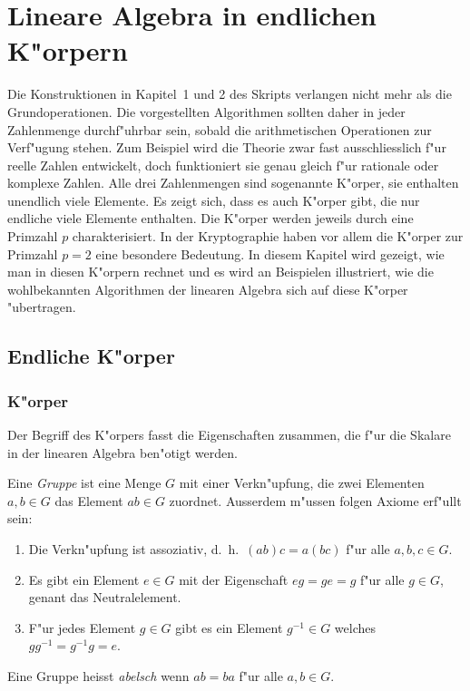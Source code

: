 %
%
%
\chapter{Lineare Algebra in endlichen K"orpern}

Die Konstruktionen in Kapitel~1 und 2 des Skripts verlangen nicht mehr
als die Grundoperationen.
Die vorgestellten Algorithmen sollten daher in jeder Zahlenmenge
durchf"uhrbar sein, sobald die arithmetischen Operationen zur
Verf"ugung stehen.
Zum Beispiel wird die Theorie zwar fast ausschliesslich f"ur reelle
Zahlen entwickelt, doch funktioniert sie genau gleich f"ur rationale
oder komplexe Zahlen.
Alle drei Zahlenmengen sind sogenannte K"orper, sie enthalten
unendlich viele Elemente.
Es zeigt sich, dass es auch K"orper gibt, die nur endliche viele
Elemente enthalten.
Die K"orper werden jeweils durch eine Primzahl $p$ charakterisiert.
In der Kryptographie haben vor allem die K"orper zur Primzahl $p=2$
eine besondere Bedeutung.
In diesem Kapitel wird gezeigt, wie man in diesen K"orpern rechnet
und es wird an Beispielen illustriert, wie die wohlbekannten Algorithmen
der linearen Algebra sich auf diese K"orper "ubertragen.

\section{Endliche K"orper}
\subsection{K"orper}
Der Begriff des K"orpers fasst die Eigenschaften zusammen, die f"ur
die Skalare in der linearen Algebra ben"otigt werden.

Eine {\em Gruppe} ist eine Menge $G$ mit einer Verkn"upfung, die zwei Elementen
$a,b\in G$ das Element $ab\in G$ zuordnet.
Ausserdem m"ussen folgen Axiome erf"ullt sein:
\begin{enumerate}[label={\bf G.\arabic*},itemsep=0mm]
\item
Die Verkn"upfung ist assoziativ, d.~h.~$(ab)c=a(bc)$ f"ur alle $a,b,c\in G$.
\item
Es gibt ein Element $e\in G$ mit der Eigenschaft $eg=ge=g$ f"ur alle $g\in G$,
genant das Neutralelement.
\item
F"ur jedes Element $g\in G$ gibt es ein Element $g^{-1}\in G$ welches
$gg^{-1}=g^{-1}g=e$.
\end{enumerate}
Eine Gruppe heisst {\em abelsch} wenn $ab=ba$ f"ur alle $a,b\in G$.

